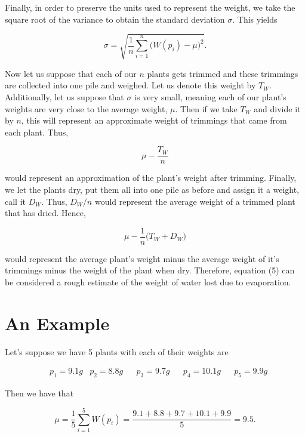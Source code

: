 \documentclass{article}
\theoremstyle{definition}
\theoremstyle{remark}
\theoremstyle{definition}
\begin{document}
Finally, in order to preserve the units used to represent the weight, we take the square root of the variance to obtain the standard deviation $\sigma$. This yields

\begin{equation}
    \sigma=\sqrt{\frac{1}{n}\sum_{i=1}^{n}\big(W(p_i)-\mu\big)^2}.
\end{equation}

\noindent Now let us suppose that each of our $n$ plants gets trimmed and these trimmings are collected into one pile and weighed. Let us denote this weight  by $T_W$. Additionally, let us suppose that $\sigma$ is very small, meaning each of our plant's weights are very close to the average weight, $\mu$. Then if we take $T_W$ and divide it by $n$, this will represent an approximate weight of trimmings that came from each plant. Thus, 

\begin{equation}
    \mu-\frac{T_W}{n}
\end{equation}

would represent an approximation of the plant's weight after trimming. Finally, we let the plants dry, put them all into one pile as before and assign it a weight, call it $D_W$. Thus, $D_W/n$ would represent the average weight of a trimmed plant that has dried. Hence, 

\begin{equation}
    \mu-\frac{1}{n}\big(T_W+D_W\big)
\end{equation}

would represent the average plant's weight minus the average weight of it's trimmings minus the weight of the plant when dry. Therefore, equation (5) can be considered a rough estimate of the weight of water lost due to evaporation. 

\section{An Example}

Let's suppose we have 5 plants with each of their weights are

\begin{align*}
    &p_1=9.1 g &p_2= 8.8 g &&p_3=9.7g& &p_4=10.1g& &p_5=9.9g
\end{align*}

Then we have that 

\begin{equation*}
    \mu=\frac{1}{5}\sum_{i=1}^{5}W(p_i)=\frac{9.1+8.8+9.7+10.1+9.9}{5}=9.5.
\end{equation*}
\end{document}
